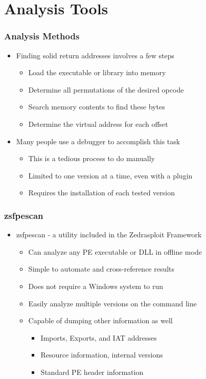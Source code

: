 \documentclass{beamer}
\newenvironment{sitemize}{\vspace{1mm}\begin{itemize}\itemsep 4pt\small}{\end{itemize}}
\begin{document}
\section{Analysis Tools}
\begin{frame}[t]
	\frametitle{Analysis Methods}
	\begin{sitemize}
		\item Finding solid return addresses involves a few steps
		\begin{sitemize}
			\item Load the executable or library into memory
			\item Determine all permutations of the desired opcode
			\item Search memory contents to find these bytes
			\item Determine the virtual address for each offset
		\end{sitemize}		
	\end{sitemize}
	
	\pause
	\begin{sitemize}
		\item Many people use a debugger to accomplish this task
		\begin{sitemize}
			\item This is a tedious process to do manually
			\item Limited to one version at a time, even with a plugin
			\item Requires the installation of each tested version
		\end{sitemize}
	\end{sitemize}	
\end{frame}

\begin{frame}[t]
	\frametitle{zsfpescan}
	\begin{sitemize}
		\item zsfpescan - a utility included in the Zedrasploit Framework
		\begin{sitemize}
			\item Can analyze any PE executable or DLL in offline mode
			\item Simple to automate and cross-reference results
			\item Does not require a Windows system to run
			\item Easily analyze multiple versions on the command line
			\item Capable of dumping other information as well
			\begin{sitemize}
				\item Imports, Exports, and IAT addresses
				\item Resource information, internal versions
				\item Standard PE header information
			\end{sitemize}
		\end{sitemize}		
	\end{sitemize}
\end{frame}
\end{document}
